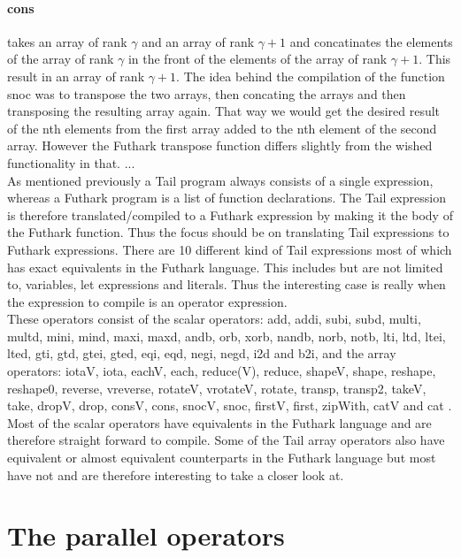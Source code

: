 \documentclass[11pt]{article}
\begin{document}
\paragraph{cons} takes an array of rank $\gamma$ and an array of rank $\gamma+1$ and concatinates the elements of the 
array of rank $\gamma$ in the front of the elements of the array of rank $\gamma +1$. This result in an array of rank $\gamma+1$. 
The idea behind the compilation of the function snoc was to transpose the two arrays, then concating the arrays and then transposing the resulting array again. That way we would get the desired result of the nth elements from the first array added to the nth element of the second array. However the Futhark transpose function differs slightly from the wished functionality in that. ...\\

As mentioned previously a Tail program always consists of a single expression,
whereas a Futhark program is a list of function declarations.
The Tail expression is therefore translated/compiled to a Futhark expression by making it the body of the Futhark function\cite{ElsmanDybdal:Array:2014}\cite{TroelsHenriksen}. 
Thus the focus should be on translating Tail expressions to Futhark expressions. 
There are 10 different kind of Tail expressions most of which has exact equivalents in the Futhark language.
This includes but are not limited to, variables, let expressions and literals.
Thus the interesting case is really when the expression to compile is an operator expression. \\

These operators consist of the scalar operators: add, addi, subi, subd, multi, multd, mini, mind, maxi, maxd, andb, orb, xorb, nandb, norb, notb, lti, ltd, ltei, lted, gti, gtd, gtei, gted, eqi, eqd, negi, negd, i2d and b2i, and the array operators: iotaV, iota, eachV, each, reduce(V), reduce, shapeV, shape, reshape, reshape0, reverse, vreverse, rotateV, vrotateV, rotate, transp, transp2, takeV, take, dropV, drop, consV, cons, snocV, snoc, firstV, first, zipWith, catV and cat \cite{ElsmanDybdal:Array:2014}. \\

Most of the scalar operators have equivalents in the Futhark language and are therefore straight forward to compile.
Some of the Tail array operators also have equivalent or almost equivalent counterparts in the Futhark language
but most have not and are therefore interesting to take a closer look at.


\section{The parallel operators}
\end{document}
